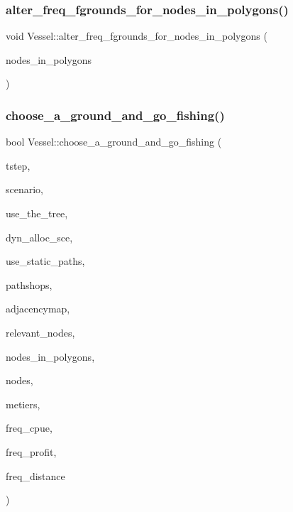 \subsubsection{\texorpdfstring{alter\_freq\_fgrounds\_for\_nodes\_in\_polygons()}{alter\_freq\_fgrounds\_for\_nodes\_in\_polygons()}}
{\footnotesize\ttfamily void Vessel\+::alter\+\_\+freq\+\_\+fgrounds\+\_\+for\+\_\+nodes\+\_\+in\+\_\+polygons (\begin{DoxyParamCaption}\item[{std\+::multimap$<$ int, int $>$}]{nodes\+\_\+in\+\_\+polygons }\end{DoxyParamCaption})}

\mbox{\label{class_vessel_a06687085c0500ae82546c74030a89134}} 
\subsubsection{\texorpdfstring{choose\_a\_ground\_and\_go\_fishing()}{choose\_a\_ground\_and\_go\_fishing()}}
{\footnotesize\ttfamily bool Vessel\+::choose\+\_\+a\+\_\+ground\+\_\+and\+\_\+go\+\_\+fishing (\begin{DoxyParamCaption}\item[{int}]{tstep,  }\item[{const \mbox{\hyperlink{structdisplace_1_1commons_1_1_scenario}{displace\+::commons\+::\+Scenario}} \&}]{scenario,  }\item[{bool}]{use\+\_\+the\+\_\+tree,  }\item[{const \mbox{\hyperlink{class_dyn_alloc_options}{Dyn\+Alloc\+Options}} \&}]{dyn\+\_\+alloc\+\_\+sce,  }\item[{int}]{use\+\_\+static\+\_\+paths,  }\item[{const std\+::vector$<$ \mbox{\hyperlink{class_path_shop}{Path\+Shop}} $>$ \&}]{pathshops,  }\item[{\mbox{\hyperlink{myutils_8h_ae689dbcb43e66abf9a513718b83bd87d}{adjacency\+\_\+map\+\_\+t}} \&}]{adjacencymap,  }\item[{vector$<$ \mbox{\hyperlink{classtypes_1_1_node_id}{types\+::\+Node\+Id}} $>$ \&}]{relevant\+\_\+nodes,  }\item[{std\+::multimap$<$ int, int $>$ \&}]{nodes\+\_\+in\+\_\+polygons,  }\item[{std\+::vector$<$ \mbox{\hyperlink{class_node}{Node}} $\ast$ $>$ \&}]{nodes,  }\item[{std\+::vector$<$ \mbox{\hyperlink{class_metier}{Metier}} $\ast$ $>$ \&}]{metiers,  }\item[{std\+::ofstream \&}]{freq\+\_\+cpue,  }\item[{std\+::ofstream \&}]{freq\+\_\+profit,  }\item[{std\+::ofstream \&}]{freq\+\_\+distance }\end{DoxyParamCaption})}

